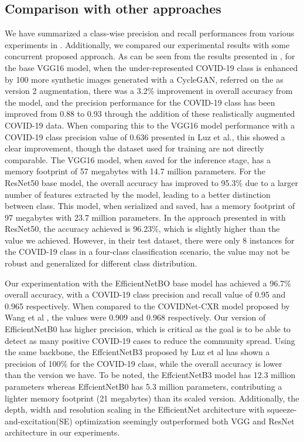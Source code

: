 \subsection{Comparison with other approaches}
We have summarized a class-wise precision and recall performances from various experiments in  . Additionally, we compared our experimental results with some concurrent proposed approach. As can be seen from the results presented in , for the base VGG16 model, when the under-represented COVID-19 class is enhanced by 100 more synthetic images generated with a CycleGAN, referred on the  as version 2 augmentation, there was a 3.2\% improvement in overall accuracy from the model, and the precision performance for the COVID-19 class has been improved from 0.88 to 0.93 through the addition of these realistically augmented COVID-19 data. When comparing this to the VGG16 model performance with a COVID-19 class precision value of 0.636 presented in Luz et al.\cite{luz2020efficient}, this showed a clear improvement, though the dataset used for training are not directly comparable. The VGG16 model, when saved for the inference stage, has a memory footprint of 57 megabytes with 14.7 million parameters. For the ResNet50 base model, the overall accuracy has improved to 95.3\% due to a larger number of features extracted by the model, leading to a better distinction between class. This model, when serialized and saved, has a memory footprint of 97 megabytes with 23.7 million parameters. In the approach presented in \cite{farooq2020covid} with ResNet50, the accuracy achieved is 96.23\%, which is slightly higher than the value we achieved. However, in their test dataset, there were only 8 instances for the COVID-19 class in a four-class classification scenario, the value may not be robust and generalized for different class distribution.

Our experimentation with the EfficientNetBO base model has achieved a 96.7\% overall accuracy, with a COVID-19 class precision and recall value of 0.95 and 0.965 respectively. When compared to the COVIDNet-CXR model proposed by Wang et al \cite{wang2020covid}, the values were 0.909 and 0.968 respectively. Our version of EfficientNetB0 has higher precision, which is critical as the goal is to be able to detect as many positive COVID-19 cases to reduce the community spread.
Using the same backbone, the EffcientNetB3 proposed by Luz et al\cite{luz2020efficient} has shown a precision of 100\% for the COVID-19 class, while the overall accuracy is lower than the version we have. To be noted, the EffcientNetB3 model has 12.3 million parameters whereas EffcientNetB0 has 5.3 million parameters, contributing a lighter memory footprint (21 megabytes) than its scaled version. Additionally, the depth, width and resolution scaling in the EfficientNet architecture with squeeze-and-excitation(SE) optimization seemingly outperformed both VGG and ResNet architecture in our experiments.

